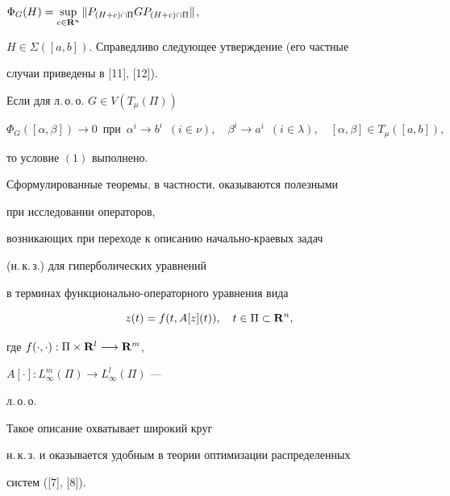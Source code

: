 ${\Phi}_G(H)=\sup\limits_{c\in{\bold R}^n}


\| P_{(H+c)\cap\Pi}GP_{(H+c)\cap\Pi} {\|}$,


$H\in \Sigma ([a,b])$. Справедливо следующее утверждение (его частные


случаи приведены в [11], [12]).





\begin{thm}


Если для л.\,о.\,о. $G\in V(T_{\mu}(\Pi))$


$$


{\Phi}_G([\alpha ,\beta ]) \longrightarrow 0 \ \; \text{при}\ \;


{\alpha}^i \longrightarrow b^i \ \; (i\in \nu), {\quad} {\beta}^i


\longrightarrow a^i \ \; (i\in \lambda), {\quad} [\alpha, \beta]\in


T_{\mu}([a,b]),


$$


то условие $(1)$ выполнено.


\end{thm}





Сформулированные теоремы, в частности, оказываются полезными


при исследовании операторов,


возникающих при переходе к описанию начально-краевых задач


(н.\,к.\,з.) для гиперболических уравнений


в терминах функционально-операторного уравнения вида


\begin{equation}


z(t)=f(t,A[z](t)),\quad t\in\Pi\subset{\bold R}^n,


\end{equation}


где $f(\cdot,\cdot):\Pi\times{\bold R}^l\longrightarrow{\bold R}^m$,


$A[\cdot]:L^m_{\infty}(\Pi)\longrightarrow L^l_{\infty}(\Pi)$ ---


л.\,о.\,о.


Такое описание охватывает широкий круг


н.\,к.\,з. и оказывается удобным в теории оптимизации распределенных


систем ([7], [8]).


